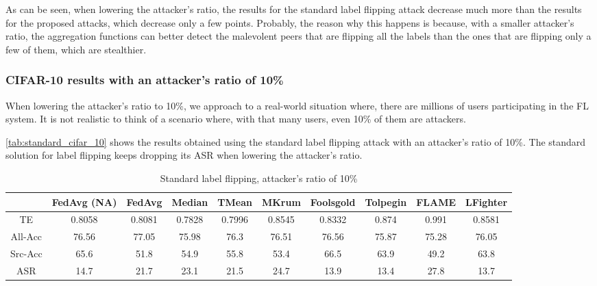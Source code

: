 As can be seen, when lowering the attacker's ratio, the results for the standard label flipping attack decrease much more than the results for the proposed attacks, which decrease only a few points. Probably, the reason why this happens is because, with a smaller attacker's ratio, the aggregation functions can better detect the malevolent peers that are flipping all the labels than the ones that are flipping only a few of them, which are stealthier.

\subsubsection{CIFAR-10 results with an attacker's ratio of 10\%}
When lowering the attacker's ratio to 10\%, we approach to a real-world situation where, there are millions of users participating in the FL system. It is not realistic to think of a scenario where, with that many users, even 10\% of them are attackers.

\autoref{tab:standard_cifar_10} shows the results obtained using the standard label flipping attack with an attacker's ratio of 10\%. The standard solution for label flipping keeps dropping its ASR when lowering the attacker's ratio.
\begin{table}[h!]
        \centering
        \small
        \begin{adjustbox}{center}
        \begin{tabular}{|c|c|c|c|c|c|c|c|c|c|}
                \hline
                & FedAvg (NA) & FedAvg & Median & TMean & MKrum & Foolsgold & Tolpegin & FLAME & LFighter \\
                \hline
                TE & 0.8058 & 0.8081 & 0.7828 & 0.7996 & 0.8545 & 0.8332 & 0.874 & 0.991 & 0.8581 \\
                \hline
                All-Acc & 76.56 & 77.05 & 75.98 & 76.3 & 76.51 & 76.56 & 75.87 & 75.28 & 76.05 \\
                \hline
                Src-Acc & 65.6 & 51.8 & 54.9 & 55.8 & 53.4 & 66.5 & 63.9 & 49.2 & 63.8 \\
                \hline
                ASR & 14.7 & 21.7 & 23.1 & 21.5 & 24.7 & 13.9 & 13.4 & 27.8 & 13.7 \\
                \hline
        \end{tabular}
        \end{adjustbox}
        \caption{Standard label flipping, attacker's ratio of 10\%}
        \label{tab:standard_cifar_10}
    \end{table}


